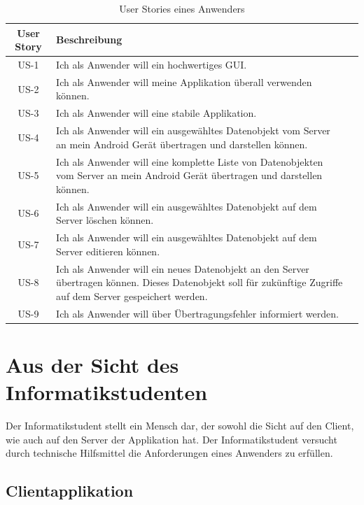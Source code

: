 \documentclass[abstracton, listof=totocnumbered,
bibliography=totocnumbered]{scrreprt}
\begin{document}
  \begin{table}[h]
    \begin{center}
      \begin{tabular}{cp{13cm}l}
        \toprule
        User Story & Beschreibung \\
        \midrule
        US-1 & Ich als Anwender will ein hochwertiges \ac{GUI}. \\
        US-2 & Ich als Anwender will meine Applikation überall verwenden können. \\
        US-3 & Ich als Anwender will eine stabile Applikation. \\
        US-4 & Ich als Anwender will ein ausgewähltes Datenobjekt vom Server an mein
        Android Gerät übertragen und darstellen können. \\
        US-5 & Ich als Anwender will eine komplette Liste von Datenobjekten vom
        Server an mein Android Gerät übertragen und darstellen können. \\
        US-6 & Ich als Anwender will ein ausgewähltes Datenobjekt auf dem Server
        löschen können. \\
        US-7 & Ich als Anwender will ein ausgewähltes Datenobjekt auf dem Server
        editieren können. \\
        US-8 & Ich als Anwender will ein neues Datenobjekt an den Server übertragen
        können. Dieses Datenobjekt soll für zukünftige Zugriffe auf dem Server
        gespeichert werden. \\
        US-9 & Ich als Anwender will über Übertragungsfehler informiert werden. \\
        \bottomrule
      \end{tabular}
      \caption{User Stories eines Anwenders}
      \label{tab:anwenderUserStories}
    \end{center}
  \end{table}
  
  \newpage
  
  \section{Aus der Sicht des Informatikstudenten}
  
  Der Informatikstudent stellt ein Mensch dar, der sowohl die Sicht auf den
  Client, wie auch auf den Server der Applikation hat. Der Informatikstudent
  versucht durch technische Hilfsmittel die Anforderungen eines Anwenders zu
  erfüllen.
  
  \subsection{Clientapplikation}
  
\end{document}
